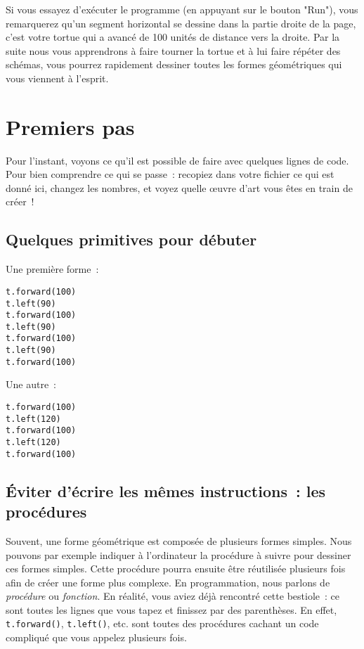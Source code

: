 \documentclass[11pt,a4paper]{article}
\begin{document}
Si vous essayez d'exécuter le programme (en appuyant sur le bouton "Run"),
vous remarquerez qu'un segment horizontal se dessine dans la partie droite de la
page, c'est votre tortue qui a avancé de 100 unités de distance vers la droite.
Par la suite nous vous apprendrons à faire tourner la tortue et à lui faire
répéter des schémas, vous pourrez rapidement dessiner toutes les formes
géométriques qui vous viennent à l'esprit.

\section{Premiers pas}

Pour l'instant, voyons ce qu'il est possible de faire avec quelques lignes de
code. Pour bien comprendre ce qui se passe~: recopiez dans votre fichier ce
qui est donné ici, changez les nombres, et voyez quelle œuvre d'art vous êtes en
train de créer~!

\subsection{Quelques primitives pour débuter}
Une première forme~:

\begin{lstlisting}
t.forward(100)
t.left(90)
t.forward(100)
t.left(90)
t.forward(100)
t.left(90)
t.forward(100)
\end{lstlisting}

Une autre~:

\begin{lstlisting}
t.forward(100)
t.left(120)
t.forward(100)
t.left(120)
t.forward(100)
\end{lstlisting}

\subsection{Éviter d'écrire les mêmes instructions~: les procédures}

Souvent, une forme géométrique est composée de plusieurs formes simples. Nous
pouvons par exemple indiquer à l'ordinateur la procédure à suivre pour dessiner
ces formes simples. Cette procédure pourra ensuite être réutilisée plusieurs
fois afin de créer une forme plus complexe. En programmation, nous parlons de
\emph{procédure} ou \emph{fonction}. En réalité, vous aviez déjà rencontré cette
bestiole~: ce sont toutes les lignes que vous tapez et finissez par des
parenthèses. En effet, \lstinline{t.forward()}, \lstinline{t.left()},
etc. sont toutes des procédures cachant un code compliqué que vous appelez
plusieurs fois.
\end{document}
